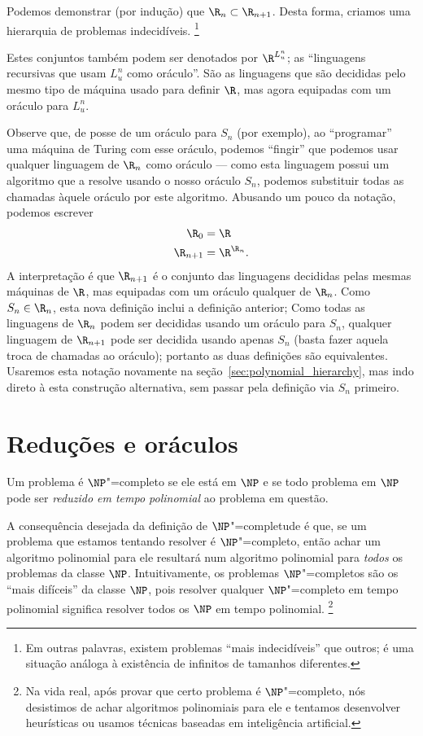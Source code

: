 Podemos demonstrar (por indução) que $\R_n \subset \R_{n+1}$.
Desta forma,
criamos uma hierarquia de problemas indecidíveis.%
\footnote{
    Em outras palavras,
    existem problemas ``mais indecidíveis'' que outros;
    é uma situação análoga à existência de infinitos de tamanhos diferentes.
}

Estes conjuntos também podem ser denotados por $\R^{L_u^n}$;
as ``linguagens recursivas que usam $L_u^n$ como oráculo''.
São as linguagens que são decididas
pelo mesmo tipo de máquina usado para definir $\R$,
mas agora equipadas com um oráculo para $L_u^n$.

Observe que,
de posse de um oráculo para $S_n$ (por exemplo),
ao ``programar'' uma máquina de Turing com esse oráculo,
podemos ``fingir'' que podemos usar qualquer linguagem de $\R_n$ como oráculo
--- como esta linguagem possui um algoritmo que a resolve
usando o nosso oráculo $S_n$,
podemos substituir todas as chamadas àquele oráculo
por este algoritmo.
Abusando um pouco da notação,
podemos escrever
\begin{equation}
    \begin{aligned}
        \R_0 &= \R \\
        \R_{n+1} &= \R^{\R_n}.
    \end{aligned}
    \label{eq:oracle_notation_abuse}
\end{equation}
A interpretação é que $\R_{n+1}$ é o conjunto das linguagens
decididas pelas mesmas máquinas de $\R$,
mas equipadas com um oráculo qualquer de $\R_n$.
Como $S_n \in \R_n$, esta nova definição inclui a definição anterior;
Como todas as linguagens de $\R_n$ podem ser decididas usando um oráculo para $S_n$,
qualquer linguagem de $\R_{n+1}$
pode ser decidida usando apenas $S_n$
(basta fazer aquela troca de chamadas ao oráculo);
portanto as duas definições são equivalentes.
Usaremos esta notação novamente na seção~\ref{sec:polynomial_hierarchy},
mas indo direto à esta construção alternativa,
sem passar pela definição via $S_n$ primeiro.

\section{Reduções e oráculos}

Um problema é $\NP$"=completo se
ele está em $\NP$
e se todo problema em $\NP$ pode ser \emph{reduzido em tempo polinomial}
ao problema em questão.

A consequência desejada da definição de $\NP$"=completude é que,
se um problema que estamos tentando resolver é $\NP$"=completo,
então achar um algoritmo polinomial para ele
resultará num algoritmo polinomial para \emph{todos} os problemas da classe $\NP$.
Intuitivamente,
os problemas $\NP$"=completos são os ``mais difíceis'' da classe $\NP$,
pois resolver qualquer $\NP$"=completo em tempo polinomial
significa resolver todos os $\NP$ em tempo polinomial.%
\footnote{
    Na vida real,
    após provar que certo problema é $\NP$"=completo,
    nós desistimos de achar algoritmos polinomiais para ele
    e tentamos desenvolver heurísticas
    ou usamos técnicas baseadas em inteligência artificial.
}

